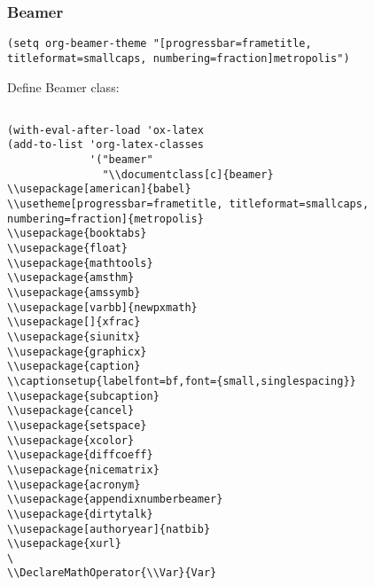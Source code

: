 \documentclass[c]{article}
\DeclareMathOperator{\Var}{Var}
\theoremstyle{plain}%
\theoremstyle{definition}
\theoremstyle{remark}
\begin{document}
\subsubsection{Beamer}
\label{sec:org55b642f}
\begin{verbatim}
(setq org-beamer-theme "[progressbar=frametitle, titleformat=smallcaps, numbering=fraction]metropolis")
\end{verbatim}
Define Beamer class:
\begin{verbatim}

(with-eval-after-load 'ox-latex
(add-to-list 'org-latex-classes
             '("beamer"
               "\\documentclass[c]{beamer}
\\usepackage[american]{babel}
\\usetheme[progressbar=frametitle, titleformat=smallcaps, numbering=fraction]{metropolis}
\\usepackage{booktabs}
\\usepackage{float}
\\usepackage{mathtools}
\\usepackage{amsthm}
\\usepackage{amssymb}
\\usepackage[varbb]{newpxmath}
\\usepackage[]{xfrac}
\\usepackage{siunitx}
\\usepackage{graphicx}
\\usepackage{caption}
\\captionsetup{labelfont=bf,font={small,singlespacing}}
\\usepackage{subcaption}
\\usepackage{cancel}
\\usepackage{setspace}
\\usepackage{xcolor}
\\usepackage{diffcoeff}
\\usepackage{nicematrix}
\\usepackage{acronym}
\\usepackage{appendixnumberbeamer}
\\usepackage{dirtytalk}
\\usepackage[authoryear]{natbib}
\\usepackage{xurl}
\
\\DeclareMathOperator{\\Var}{Var}

\end{verbatim}
\end{document}
